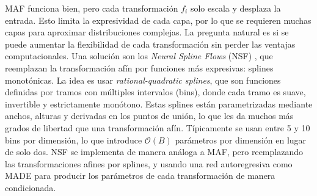 MAF funciona bien, pero cada transformación $f_i$ solo escala y desplaza la entrada. Esto limita la expresividad de cada capa, por lo que se requieren muchas capas para aproximar distribuciones complejas. La pregunta natural es si se puede aumentar la flexibilidad de cada transformación sin perder las ventajas computacionales. Una solución son los \textit{Neural Spline Flows} (NSF) \cite{durkan2019nsf}, que reemplazan la transformación afín por funciones más expresivas: splines monotónicas. La idea es usar \textit{rational-quadratic splines}, que son funciones definidas por tramos con múltiples intervalos (bins), donde cada tramo es suave, invertible y estrictamente monótono. Estas splines están parametrizadas mediante anchos, alturas y derivadas en los puntos de unión, lo que les da muchos más grados de libertad que una transformación afín. Típicamente se usan entre 5 y 10 bins por dimensión, lo que introduce $\mathcal{O}(B)$ parámetros por dimensión en lugar de solo dos. NSF se implementa de manera análoga a MAF, pero reemplazando las transformaciones afines por splines, y usando una red autoregresiva como MADE para producir los parámetros de cada transformación de manera condicionada.

